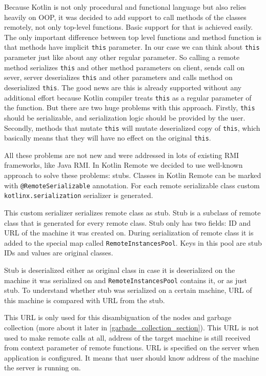\documentclass[a4paper,11pt,oneside]{article}
\newcommand{\kotlini}[1]{\texttt{#1}}
\newcommand{\ki}[1]{\kotlini{#1}}
\begin{document}
Because Kotlin is not only procedural and functional language but also relies heavily on OOP, it
was decided to add support to call methods of the classes remotely, not only top-level functions.
Basic support for that is achieved easily. The only important difference between top level
functions and method function is that methods have implicit \ki{this} parameter. In our case we can
think about \ki{this} parameter just like about any other regular parameter. So calling a remote
method serializes \ki{this} and other method parameters on client, sends call on sever, server
deserializes \ki{this} and other parameters and calls method on deserialized \ki{this}. The good
news are this is already supported without any additional effort because Kotlin compiler treats
\ki{this} as a regular parameter of the function. But there are two huge problems with this
approach. Firstly, \ki{this} should be serializable, and serialization logic should be provided by
the user. Secondly, methods that mutate \ki{this} will mutate deserialized copy of \ki{this}, which
basically means that they will have no effect on the original \ki{this}. 

All these problems are not new and were addressed in lots of existing RMI frameworks, like Java RMI. 
In Kotlin Remote we decided to use well-known approach to solve these problems: stubs. Classes in 
Kotlin Remote can be marked with \ki{@RemoteSerializable} annotation. For each remote serializable class
custom \texttt{kotlinx.serialization} serializer is generated. 

This custom serializer serializes remote class as stub. Stub is a subclass of remote class that 
is generated for every remote class. Stub only has two fields: ID and URL of the machine it was created on. 
During serialization of remote class it is added to the special map called \ki{RemoteInstancesPool}. 
Keys in this pool are stub IDs and values are original classes. 

Stub is deserialized either as original class in case it is deserialized on the machine it was 
serialized on and \ki{RemoteInstancesPool} contains it, or as just stub. To understand whether stub 
was serialized on a certain machine, URL of this machine is compared with URL from the stub.

This URL is only used for this disambiguation of the nodes and garbage collection 
(more about it later in \ref{garbade_collection_section}). This URL is not used to make remote calls at all,
address of the target machine is still received from context parameter of remote functions. URL is specified
on the server when application is configured. It means that user should know address of the machine 
the server is running on.
\end{document}
